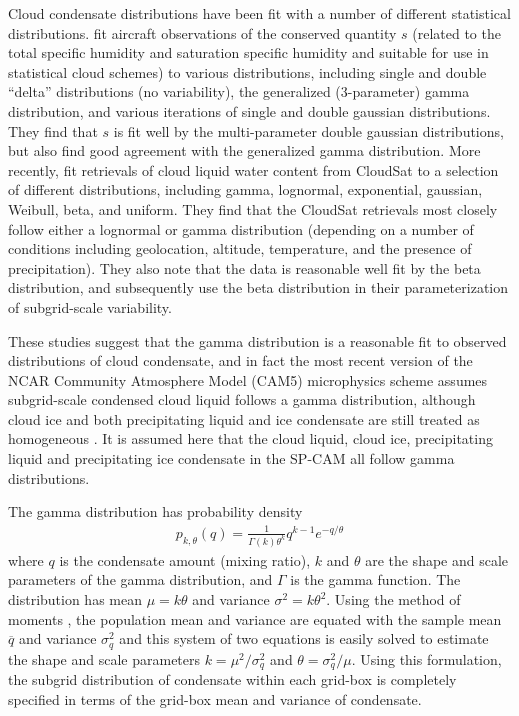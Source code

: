 Cloud condensate distributions have been fit with a number of different
statistical distributions. \citet{larson_et_al_2001} fit aircraft
observations of the conserved quantity \(s\) (related to the total
specific humidity and saturation specific humidity and suitable for use
in statistical cloud schemes) to various distributions, including single
and double ``delta'' distributions (no variability), the generalized
(3-parameter) gamma distribution, and various iterations of single and
double gaussian distributions. They find that \(s\) is fit well by the
multi-parameter double gaussian distributions, but also find good
agreement with the generalized gamma distribution. More recently,
\citet{lee_et_al_2010} fit retrievals of cloud liquid water content from
CloudSat to a selection of different distributions, including gamma,
lognormal, exponential, gaussian, Weibull, beta, and uniform. They find
that the CloudSat retrievals most closely follow either a lognormal or
gamma distribution (depending on a number of conditions including
geolocation, altitude, temperature, and the presence of precipitation).
They also note that the data is reasonable well fit by the beta
distribution, and \citet{oreopoulos_et_al_2012} subsequently use the
beta distribution in their parameterization of subgrid-scale
variability.

These studies suggest that the gamma distribution is a reasonable fit to
observed distributions of cloud condensate, and in fact the most recent
version of the NCAR Community Atmosphere Model (CAM5) microphysics
scheme assumes subgrid-scale condensed cloud liquid follows a gamma
distribution, although cloud ice and both precipitating liquid and ice
condensate are still treated as homogeneous \citep{neale_et_al_2010b}.
It is assumed here that the cloud liquid, cloud ice, precipitating
liquid and precipitating ice condensate in the SP-CAM all follow gamma
distributions.

The gamma distribution has probability density \[\begin{gathered} 
    p_{k, \theta}(q) 
        = \frac{1}{\Gamma(k) \theta^k} q^{k - 1} e^{-q/\theta}
\end{gathered}\] where \(q\) is the condensate amount (mixing ratio),
\(k\) and \(\theta\) are the shape and scale parameters of the gamma
distribution, and \(\Gamma\) is the gamma function. The distribution has
mean \(\mu = k\theta\) and variance \(\sigma^2 = k \theta^2\). Using the
method of moments \citep[e.g.,][]{wilks_2011}, the population mean and
variance are equated with the sample mean \(\overline{q}\) and variance
\(\sigma_q^2\) and this system of two equations is easily solved to
estimate the shape and scale parameters \(k = \mu^2 / \sigma_q^2\) and
\(\theta = \sigma_q^2 / \mu\). Using this formulation, the subgrid
distribution of condensate within each grid-box is completely specified
in terms of the grid-box mean and variance of condensate.

